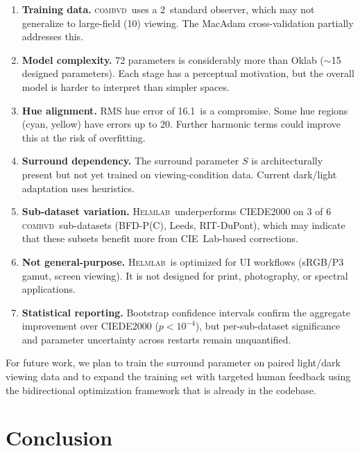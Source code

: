 \documentclass[11pt, twocolumn]{article}
\newcommand{\helmlab}{\textsc{Helmlab}}
\newcommand{\combvd}{\textsc{combvd}}
\begin{document}
\begin{enumerate}
  \item \textbf{Training data.} \combvd\ uses a 2\textdegree\ standard
    observer, which may not generalize to large-field (10\textdegree)
    viewing. The MacAdam cross-validation partially addresses this.

  \item \textbf{Model complexity.} 72 parameters is considerably more
    than Oklab ($\sim$15 designed parameters). Each stage has a
    perceptual motivation, but the overall model is harder to
    interpret than simpler spaces.

  \item \textbf{Hue alignment.} RMS hue error of 16.1\textdegree\ is
    a compromise. Some hue regions (cyan, yellow) have errors up to
    20\textdegree. Further harmonic terms could improve this at the
    risk of overfitting.

  \item \textbf{Surround dependency.} The surround parameter $S$ is
    architecturally present but not yet trained on viewing-condition
    data. Current dark/light adaptation uses heuristics.

  \item \textbf{Sub-dataset variation.} \helmlab\ underperforms
    CIEDE2000 on 3 of 6 \combvd\ sub-datasets (BFD-P(C), Leeds,
    RIT-DuPont), which may indicate that these subsets benefit
    more from CIE~Lab-based corrections.

  \item \textbf{Not general-purpose.} \helmlab\ is optimized for UI
    workflows (sRGB/P3 gamut, screen viewing). It is not designed for
    print, photography, or spectral applications.

  \item \textbf{Statistical reporting.} Bootstrap confidence intervals
    confirm the aggregate improvement over CIEDE2000 ($p < 10^{-4}$),
    but per-sub-dataset significance and parameter uncertainty across
    restarts remain unquantified.
\end{enumerate}

For future work, we plan to train the surround parameter on paired
light/dark viewing data and to expand the training set with targeted
human feedback using the bidirectional optimization framework that is
already in the codebase.


\section{Conclusion}
\label{sec:conclusion}
\end{document}
